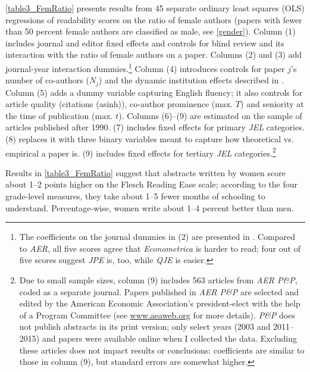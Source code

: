 \autoref{table3_FemRatio} presents results from 45 separate ordinary least squares (OLS) regressions of readability scores on the ratio of female authors (papers with fewer than 50 percent female authors are classified as male, see \autoref{gender}). Column (1) includes journal and editor fixed effects and controls for blind review and its interaction with the ratio of female authors on a paper. Columns (2) and (3) add journal-year interaction dummies.\footnote{The coefficients on the journal dummies in (2) are presented in . Compared to \emph{AER}, all five scores agree that \emph{Econometrica} is harder to read; four out of five scores suggest \emph{JPE} is, too, while \emph{QJE} is easier.} Column (4) introduces controls for paper $j$'s number of co-authors ($N_j$) and the dynamic institution effects described in . Column (5) adds a dummy variable capturing English fluency; it also controls for article quality (citations (asinh)), co-author prominence ($\text{max. }T$) and seniority at the time of publication ($\text{max. }t$). Columns (6)--(9) are estimated on the sample of articles published after 1990. (7) includes fixed effects for primary \emph{JEL} categories. (8) replaces it with three binary variables meant to capture how theoretical vs. empirical a paper is. (9) includes fixed effects for tertiary \emph{JEL} categories.\footnote{\label{FootnoteAERpp}Due to small sample sizes, column (9) includes 563 articles from \emph{AER P\&P}, coded as a separate journal. Papers published in \emph{AER P\&P} are selected and edited by the American Economic Association's president-elect with the help of a Program Committee (see \href{https://www.aeaweb.org/journals/pandp/about-pandp}{www.aeaweb.org} for more details). \emph{P\&P} does not publish abstracts in its print version; only select years (2003 and 2011--2015) and papers were available online when I collected the data. Excluding these articles does not impact results or conclusions: coefficients are similar to those in column (9), but standard errors are somewhat higher.}

Results in \autoref{table3_FemRatio} suggest that abstracts written by women score about 1--2 points higher on the Flesch Reading Ease scale; according to the four grade-level measures, they take about 1--5 fewer months of schooling to understand. Percentage-wise, women write about 1--4 percent better than men.



